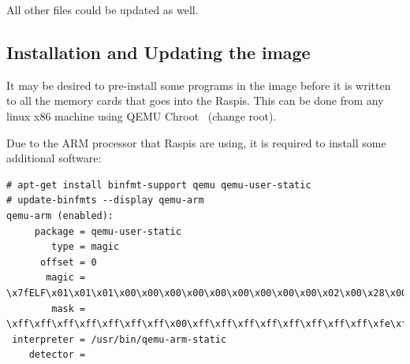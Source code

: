 %

All other files could be updated as well.

\subsection{Installation and Updating the image}

It may be desired to pre-install some programs in the image before it is
written to all the memory cards that goes into the \ac{Raspi}s.
This can be done from any linux x86 machine using QEMU Chroot~\cite{QemuUserEmulation}
(change root).

Due to the \ac{ARM} processor that \ac{Raspi}s are using, it is required to
install some additional software:

\begin{lstlisting}[]
# apt-get install binfmt-support qemu qemu-user-static
# update-binfmts --display qemu-arm
qemu-arm (enabled):
     package = qemu-user-static
        type = magic
      offset = 0
       magic = \x7fELF\x01\x01\x01\x00\x00\x00\x00\x00\x00\x00\x00\x00\x02\x00\x28\x00
        mask = \xff\xff\xff\xff\xff\xff\xff\x00\xff\xff\xff\xff\xff\xff\xff\xff\xfe\xff\xff\xff
 interpreter = /usr/bin/qemu-arm-static
    detector = 
\end{lstlisting}
\FloatBarrier
\vspace{-5mm}


